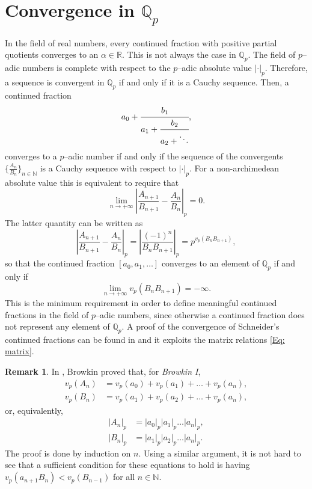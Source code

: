 \documentclass[12pt, reqno]{amsart}
\theoremstyle{plain}
\theoremstyle{definition}
\newtheorem{Remark}[Theorem]{Remark}
\begin{document}
\section{Convergence in $\mathbb{Q}_p$}\label{Sec: convergence}
In the field of real numbers, every continued fraction with positive partial quotients converges to an $\alpha\in\mathbb{R}$. This is not always the case in $\mathbb{Q}_p$. The field of $p$--adic numbers is complete with respect to the $p$--adic absolute value $|\cdot|_p$. Therefore, a sequence is convergent in $\mathbb{Q}_p$ if and only if it is a Cauchy sequence. Then, a continued fraction
\[a_0+\cfrac{b_1}{a_1+\cfrac{b_2}{a_2+\ddots}},\]
converges to a $p$--adic number if and only if the sequence of the convergents $\{\frac{A_n}{B_n}\}_{n\in\mathbb{N}}$ is a Cauchy sequence with respect to $|\cdot|_p$. For a non-archimedean absolute value this is equivalent to require that
\[ \lim \limits_{n \rightarrow +\infty} \left|\frac{A_{n+1}}{B_{n+1}}-\frac{A_{n}}{B_{n}} \right|_p=0.\]
The latter quantity can be written as
\begin{equation}\label{Eq: conve}
\left|\frac{A_{n+1}}{B_{n+1}}-\frac{A_{n}}{B_{n}} \right|_p=\left|\frac{(-1)^n}{B_{n}B_{n+1}}\right|_p=p^{v_p(B_nB_{n+1})},
\end{equation}
so that the continued fraction $[a_0,a_1,\ldots]$ converges to an element of $\mathbb{Q}_p$ if and only if
\[\lim\limits_{n\rightarrow +\infty} v_p(B_nB_{n+1})=-\infty.\]
This is the minimum requirement in order to define meaningful continued fractions in the field of $p$--adic numbers, since otherwise a continued fraction does not represent any element of $\mathbb{Q}_p$. A proof of the convergence of Schneider's continued fractions can be found in \cite{VDP} and it exploits the matrix relations \eqref{Eq: matrix}.


\begin{Remark}\label{Rem: ConveBr}
In \cite{BI}, Browkin proved that, for \textit{Browkin I},
\begin{equation}
\begin{split}
v_p(A_n)&=v_p(a_0)+v_p(a_1)+\ldots+v_p(a_n),\\
v_p(B_n)&=v_p(a_1)+v_p(a_2)+\ldots+v_p(a_n),
\end{split}
\end{equation}
or, equivalently,
\begin{equation}
\begin{split}
|A_n|_p&=|a_0|_p|a_1|_p\ldots|a_n|_p,\\
|B_n|_p&=|a_1|_p|a_2|_p\ldots|a_n|_p.
\end{split}
\end{equation}
The proof is done by induction on $n$. Using a similar argument, it is not hard to see that a sufficient condition for these equations to hold is having $v_p(a_{n+1}B_n)<v_p(B_{n-1})$ for all $n\in\mathbb{N}$.
\end{Remark}
\end{document}
